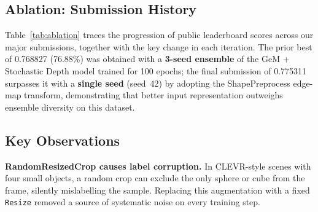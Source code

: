 \documentclass{article}
\theoremstyle{plain}
\theoremstyle{definition}
\theoremstyle{remark}
\begin{document}
\subsection{Ablation: Submission History}

Table~\ref{tab:ablation} traces the progression of public leaderboard
scores across our major submissions, together with the key change in
each iteration.  The prior best of 0.768827 (76.88\%) was obtained
with a \textbf{3-seed ensemble} of the GeM + Stochastic Depth model
trained for 100 epochs; the final submission of 0.775311 surpasses it
with a \textbf{single seed} (seed~42) by adopting the ShapePreprocess
edge-map transform, demonstrating that better input representation
outweighs ensemble diversity on this dataset.

\begin{table}[t]
\caption{Public leaderboard score progression across major submissions.}
\label{tab:ablation}
\vskip 0.15in
\begin{center}
\end{center}
\vskip -0.1in
\end{table}

\subsection{Key Observations}

\textbf{RandomResizedCrop causes label corruption.}
In CLEVR-style scenes with four small objects, a random crop can
exclude the only sphere or cube from the frame, silently mislabelling
the sample.  Replacing this augmentation with a fixed \texttt{Resize}
removed a source of systematic noise on every training step.
\end{document}
